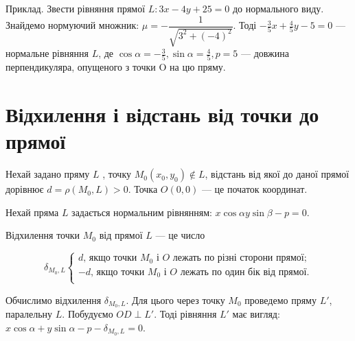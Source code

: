 Приклад. Звести рівняння прямої $L : 3x-4y+25 = 0$ до нормального виду.
Знайдемо нормуючий множник:
$\mu = -\dfrac{1}{\sqrt{3^2 + (-4)^2}}$. Тоді
$-\frac{3}{5}x + \frac{4}{5}y - 5 = 0$ --- нормальне рівняння $L$, де
$\cos\alpha = -\frac{3}{5}, \sin\alpha = \frac{4}{5}, p = 5$ --- довжина перпендикуляра,
опущеного з точки O на цю пряму. 

\section{Відхилення і відстань від точки до прямої}

\parbox{140px}{}
\parbox{7.7cm}{
	Нехай задано пряму $L$ , точку $M_0(x_0,y_0)\not\in L$,
	відстань від якої до даної прямої дорівнює
	$d = \rho(M_0, L) > 0$. Точка $O(0,0)$ --- це
	початок координат.

	Нехай пряма $L$ задається нормальним
	рівнянням: $x\cos\alpha y\sin\beta - p = 0$.
}

\begin{definition}
	Відхилення точки $M_0$ від прямої $L$ --- це число

	$$\delta_{M_0,L}\left\{\begin{array}{l}
		d\text{, якщо точки } M_0 \text{ і } O \text{ лежать по різні сторони прямої;} \\
		-d\text{, якщо точки } M_0 \text{ і } O \text{ лежать по один бік від прямої.} \\
	\end{array}\right.$$
\end{definition}


Обчислимо відхилення $\delta_{M_0,L}$. Для цього через точку $M_0$ проведемо пряму $L'$,
паралельну $L$. Побудуємо $OD \perp L'$. Тоді рівняння $L'$ має вигляд:
$x\cos\alpha + y\sin\alpha - p - \delta_{M_0,L} = 0$.

